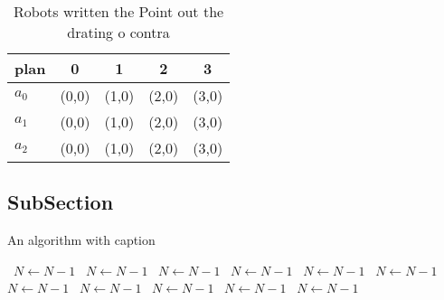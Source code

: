 \documentclass[a4paper]{article}
\begin{document}
\begin{table}
\begin{adjustbox}{width=0.6\columnwidth}
\begin{tabular}{|l|l|l|l|l|}
\hline
\textbf{plan} & \multicolumn{1}{c|}{\textbf{0}} & \multicolumn{1}{c|}{\textbf{1}} & \multicolumn{1}{c|}{\textbf{2}} & \multicolumn{1}{c|}{\textbf{3}} \\ \hline
\textbf{$a_0$}  & (0,0) & (1,0) & (2,0) & (3,0) \\ \hline
\textbf{$a_1$}  & (0,0) & (1,0) & (2,0) & (3,0) \\ \hline
\textbf{$a_2$}  & (0,0) & (1,0) & (2,0) & (3,0) \\ \hline
\end{tabular}
\end{adjustbox}
\caption{Robots written the Point out the drating o contra
}
\end{table}

\subsection{SubSection}

\begin{algorithm}
\caption{An algorithm with caption}
\begin{algorithmic}
\    \State $N \gets N - 1$
\    \State $N \gets N - 1$
\    \State $N \gets N - 1$
\    \State $N \gets N - 1$
\    \State $N \gets N - 1$
\    \State $N \gets N - 1$
\    \State $N \gets N - 1$
\    \State $N \gets N - 1$
\    \State $N \gets N - 1$
\    \State $N \gets N - 1$
\    \State $N \gets N - 1$
\EndWhile
\end{algorithmic}
\end{algorithm}
\end{document}

